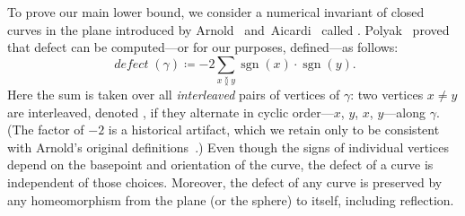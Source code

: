\documentclass[11pt,twoside]{article}
\def\sgn{\operatorname{sgn}}
\def\Defect{\operatorname{\mathit{defect}}}
\numberwithin{figure}{section}
\begin{document}
To prove our main lower bound, we consider a numerical invariant of closed curves in the plane introduced by Arnold~\cite{a-tipcc-94, a-pctip-94} and~Aicardi~\cite{a-tc-94} called . Polyak~\cite{p-icfgd-98} proved that defect can be computed---or for our purposes, defined---as follows:
\[
	\Defect(\gamma) \coloneqq -2 \sum_{x\between y} \sgn(x)\cdot\sgn(y).
\]
Here the sum is taken over all \emph{interleaved} pairs of vertices of $\gamma$: two vertices $x\ne y$ are interleaved, denoted , if they alternate in cyclic order---$x$, $y$, $x$, $y$---along $\gamma$.
(The factor of $-2$ is a historical artifact, which we retain only to be consistent with Arnold's original definitions~\cite{a-tipcc-94, a-pctip-94}.)
Even though the signs of individual vertices depend on the basepoint and orientation of the curve, the defect of a curve is independent of those choices. Moreover, the defect of any curve is preserved by any homeomorphism from the plane (or the sphere) to itself, including reflection. 

\end{document}
